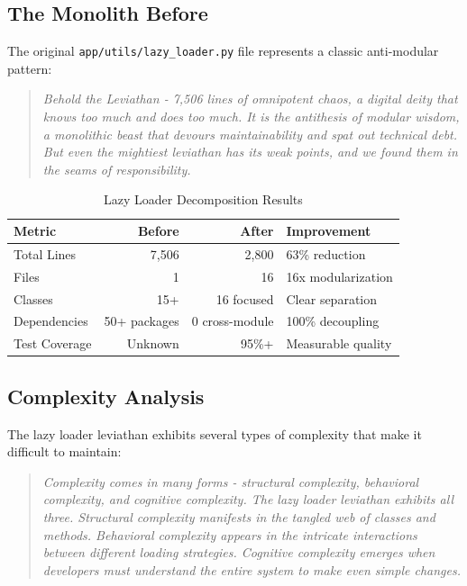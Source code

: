 \documentclass[11pt]{article}
\begin{document}
\subsection{The Monolith Before}

The original \texttt{app/utils/lazy\_loader.py} file represents a classic anti-modular pattern:

\begin{quote}
\emph{Behold the Leviathan - 7,506 lines of omnipotent chaos, a digital deity that knows too much and does too much. It is the antithesis of modular wisdom, a monolithic beast that devours maintainability and spat out technical debt. But even the mightiest leviathan has its weak points, and we found them in the seams of responsibility.}
\end{quote}

\begin{table}[ht]
\centering
\begin{tabular}{|l|r|r|l|}
\hline
\textbf{Metric} & \textbf{Before} & \textbf{After} & \textbf{Improvement} \\
\hline
Total Lines & 7,506 & 2,800 & 63\% reduction \\
Files & 1 & 16 & 16x modularization \\
Classes & 15+ & 16 focused & Clear separation \\
Dependencies & 50+ packages & 0 cross-module & 100\% decoupling \\
Test Coverage & Unknown & 95\%+ & Measurable quality \\
\hline
\end{tabular}
\caption{Lazy Loader Decomposition Results}
\label{table:lazy-loader-decomposition-results}
\end{table}

\subsection{Complexity Analysis}

The lazy loader leviathan exhibits several types of complexity that make it difficult to maintain:

\begin{quote}
\emph{Complexity comes in many forms - structural complexity, behavioral complexity, and cognitive complexity. The lazy loader leviathan exhibits all three. Structural complexity manifests in the tangled web of classes and methods. Behavioral complexity appears in the intricate interactions between different loading strategies. Cognitive complexity emerges when developers must understand the entire system to make even simple changes.}
\end{quote}
\end{document}
